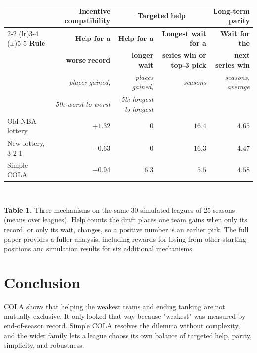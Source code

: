 \documentclass[10pt]{article}
\begin{document}
\begin{center}
\footnotesize
\setlength{\tabcolsep}{5pt}
\renewcommand{\arraystretch}{1.0}
\begin{tabular}{l r r r r}
\toprule
 & \textbf{Incentive compatibility} & \multicolumn{2}{c}{\textbf{Targeted help}} & \textbf{Long-term parity} \\
\cmidrule(lr){2-2} \cmidrule(lr){3-4} \cmidrule(lr){5-5}
\textbf{Rule} & \textbf{Help for a} & \textbf{Help for a} & \textbf{Longest wait for a} & \textbf{Wait for the} \\
 & \textbf{worse record} & \textbf{longer wait} & \textbf{series win or top-3 pick} & \textbf{next series win} \\
 & \textit{places gained,} & \textit{places gained,} & \textit{seasons} & \textit{seasons, average} \\
 & \textit{5th-worst to worst} & \textit{5th-longest to longest} & & \\
\midrule
Old NBA lottery & $+1.32$ & $0$ & $16.4$ & $4.65$ \\
New lottery, 3-2-1 & $-0.63$ & $0$ & $16.3$ & $4.47$ \\
\rowcolor{accent}
Simple COLA & $-0.94$ & $6.3$ & $5.5$ & $4.58$ \\
\bottomrule
\end{tabular}\\[1pt]
\begin{minipage}{0.99\linewidth}\scriptsize
\textbf{Table 1.} Three mechanisms on the same 30 simulated leagues of 25 seasons (means over leagues). Help counts the draft places one team gains when only its record, or only its wait, changes, so a positive number is an earlier pick. The full paper provides a fuller analysis, including rewards for losing from other starting positions and simulation results for six additional mechanisms.
\end{minipage}
\end{center}


\section{Conclusion}

COLA shows that helping the weakest teams and ending tanking are not mutually exclusive. It only looked that way because "weakest" was measured by end-of-season record. Simple COLA resolves the dilemma without complexity, and the wider family lets a league choose its own balance of targeted help, parity, simplicity, and robustness.
\end{document}
